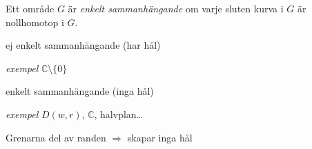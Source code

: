 \begin{definition}
Ett område $G$ är \emph{enkelt sammanhängande} om varje sluten kurva i $G$ är nollhomotop i $G$.
\begin{minipage}[t]{0.48\linewidth}
ej enkelt sammanhängande (har hål)

\emph{exempel} $\mathbb{C} \setminus \{0\}$
\end{minipage}\hfill
\begin{minipage}[t]{0.48\linewidth}
enkelt sammanhängande (inga hål)

\emph{exempel} $D(w, r)$, $\mathbb{C}$, halvplan\dots

\textcolor{blue!60!black}{Grenarna del av randen $\Rightarrow$ skapar inga hål}
\end{minipage}
\end{definition}
